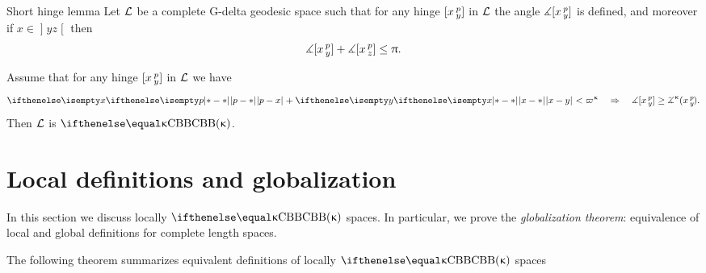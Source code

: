 \begin{thm}{Short hinge lemma}\label{lem:devel-glob}
Let $\mathcal{L}$ be a complete G-delta geodesic space such that for any hinge $[x\,{}^{p}_{y}]$ in $\mathcal{L}$ the angle $\measuredangle[x\,{}^{p}_{y}]$ is defined, 
and moreover if $x\in \mathopen{]}y z\mathclose{[}$ then
\[\mangle\hinge x p y+\mangle\hinge x p z\le \pi.\] 

Assume that  for any hinge $[x\,{}^{p}_{y}]$ in $\mathcal{L}$ we have
\[\dist{p}{ x}{}+\dist{x}{ y}{}
<\varpi\kappa
\quad\Rightarrow\quad 
\mangle\hinge x p y
\ge\angk\kappa x p y.\]
Then $\mathcal{L}$ is $\Alex\kappa$.
\end{thm}




\section{Local definitions and globalization}\label{sec:loc}


In this section we discuss locally $\Alex{\kappa}$ spaces.
In particular, we prove the {}\emph{globalization theorem}: equivalence of local and global definitions for complete length spaces.

The following theorem summarizes equivalent definitions of locally $\Alex{\kappa}$ spaces

